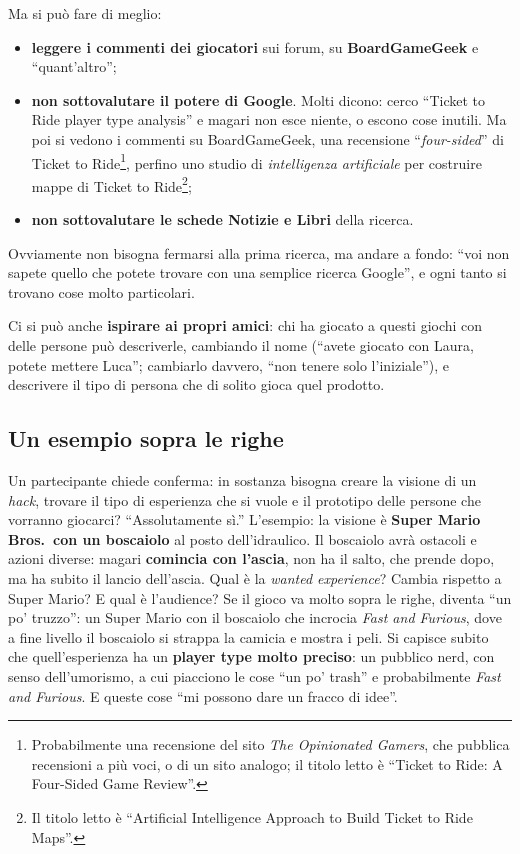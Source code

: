 Ma si può fare di meglio:
\begin{itemize}
  \item \textbf{leggere i commenti dei giocatori} sui forum, su
        \textbf{BoardGameGeek} e ``quant'altro'';
  \item \textbf{non sottovalutare il potere di Google}. Molti dicono: cerco
        ``Ticket to Ride player type analysis'' e magari non esce niente, o
        escono cose inutili. Ma poi si vedono i commenti su BoardGameGeek, una
        recensione ``\emph{four-sided}'' di Ticket to Ride\footnote{Probabilmente
        una recensione del sito \emph{The Opinionated Gamers}, che pubblica
        recensioni a più voci, o di un sito analogo; il titolo letto è ``Ticket
        to Ride: A Four-Sided Game Review''.}, perfino uno studio di
        \emph{intelligenza artificiale} per costruire mappe di Ticket to
        Ride\footnote{Il titolo letto è ``Artificial Intelligence Approach to
        Build Ticket to Ride Maps''.};
  \item \textbf{non sottovalutare le schede Notizie e Libri} della ricerca.
\end{itemize}
Ovviamente non bisogna fermarsi alla prima ricerca, ma andare a fondo: ``voi non
sapete quello che potete trovare con una semplice ricerca Google'', e ogni tanto
si trovano cose molto particolari.

Ci si può anche \textbf{ispirare ai propri amici}: chi ha giocato a questi giochi
con delle persone può descriverle, cambiando il nome (``avete giocato con Laura,
potete mettere Luca''; cambiarlo davvero, ``non tenere solo l'iniziale''), e
descrivere il tipo di persona che di solito gioca quel prodotto.

\subsection{Un esempio sopra le righe}

Un partecipante chiede conferma: in sostanza bisogna creare la visione di un
\emph{hack}, trovare il tipo di esperienza che si vuole e il prototipo delle
persone che vorranno giocarci? ``Assolutamente sì.'' L'esempio: la visione è
\textbf{Super Mario Bros.\ con un boscaiolo} al posto dell'idraulico. Il
boscaiolo avrà ostacoli e azioni diverse: magari \textbf{comincia con l'ascia},
non ha il salto, che prende dopo, ma ha subito il lancio dell'ascia. Qual è la
\emph{wanted experience}? Cambia rispetto a Super Mario? E qual è l'audience? Se il
gioco va molto sopra le righe, diventa ``un po' truzzo'': un Super Mario con il
boscaiolo che incrocia \emph{Fast and Furious}, dove a fine livello il boscaiolo
si strappa la camicia e mostra i peli. Si capisce subito che quell'esperienza ha un
\textbf{player type molto preciso}: un pubblico nerd, con senso dell'umorismo, a
cui piacciono le cose ``un po' trash'' e probabilmente \emph{Fast and Furious}. E
queste cose ``mi possono dare un fracco di idee''.

